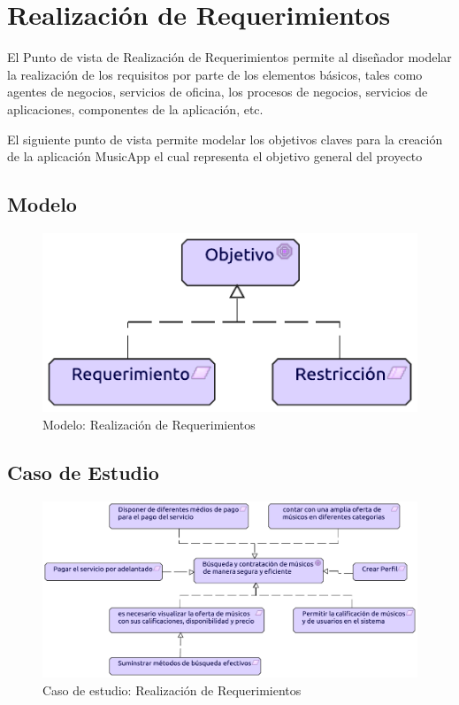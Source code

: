 \newpage

\section{Realización de Requerimientos}
El Punto de vista de Realización de Requerimientos permite al diseñador modelar la realización de los requisitos por parte de los elementos básicos, tales como agentes de negocios, servicios de oficina, los procesos de negocios, servicios de aplicaciones, componentes de la aplicación, etc. \cite{ArchiMat55:online} \vspace{\baselineskip}

El siguiente punto de vista permite modelar los objetivos claves para la creación de la aplicación MusicApp el cual representa el objetivo general del proyecto

\subsection{Modelo}
\begin{figure}[h!]
	\centering
	\includegraphics[width=0.8\linewidth]{Arquitectura/Motivacion/imgs/RealizacionMetamodelo.pdf}
	\caption{Modelo: Realización de Requerimientos}
\end{figure}
\newpage
\subsection{Caso de Estudio}
\begin{figure}[h!]
	\centering
	\includegraphics[width=\linewidth]{Arquitectura/Motivacion/imgs/Realizacion.pdf}
	\caption{Caso de estudio: Realización de Requerimientos}
	\label{fig:comportamiento}
\end{figure}

